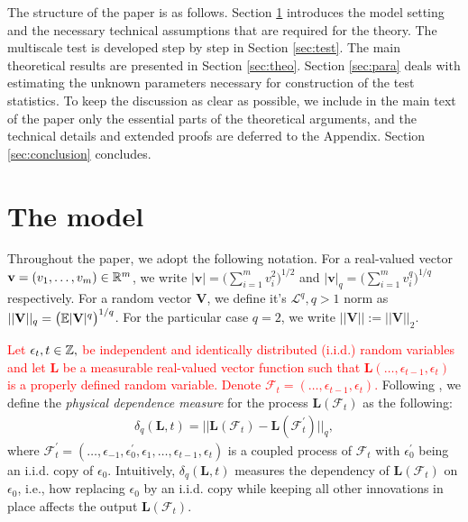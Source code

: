 \documentclass[a4paper,12pt]{article}
\begin{document}
The structure of the paper is as follows. Section \ref{sec:model} introduces the model setting and the necessary technical assumptions that are required for the theory. The multiscale test is developed step by step in Section \ref{sec:test}. The main theoretical results are presented in Section \ref{sec:theo}. Section \ref{sec:para} deals with estimating the unknown parameters necessary for construction of the test statistics. To keep the discussion as clear as possible, we include in the main text of the paper only the essential parts of the theoretical arguments, and the technical details and extended proofs are deferred to the Appendix. Section \ref{sec:conclusion} concludes.


\section{The model}\label{sec:model}

Throughout the paper, we adopt the following notation. For a real-valued vector \linebreak $\mathbf{v} = (v_1, \ldots, v_m)\in\mathbb{R}^m$, we write $|\mathbf{v}| = \big(\sum_{i=1}^m v_i^2\big)^{1/2}$ and $|\mathbf{v}|_q = \big(\sum_{i=1}^m v_i^q\big)^{1/q}$ respectively. For a random vector $\mathbf{V}$, we define it's $\mathcal{L}^q, q>1$ norm as $||\mathbf{V}||_q = \big(\mathbb{E} |\mathbf{V}|^q\big)^{1/q}$. For the particular case $q = 2$, we write $||\mathbf{V}|| := ||\mathbf{V}||_2$.

\textcolor{red}{Let $\epsilon_t, t \in \mathbb{Z},$ be independent and identically distributed (i.i.d.) random variables and let $\mathbf{L}$ be a measurable real-valued vector function such that $\mathbf{L}(\ldots, \epsilon_{t-1}, \epsilon_t)$ is a properly defined random variable. Denote $\mathcal{F}_t  = (\ldots, \epsilon_{t-1}, \epsilon_t)$.}  Following \cite{Wu2005}, we define the \textit{physical dependence measure} for the process $\mathbf{L}(\mathcal{F}_t)$ as the following:
\begin{align}\label{eq:physical_dep}
 \delta_q(\mathbf{L}, t) = || \mathbf{L}(\mathcal{F}_t) - \mathbf{L}(\mathcal{F}_t^\prime) ||_q,
\end{align}
where $\mathcal{F}_t^\prime  = (\ldots, \epsilon_{-1}, \epsilon^\prime_0, \epsilon_1, \ldots, \epsilon_{t-1}, \epsilon_t)$ is a coupled process of $\mathcal{F}_t$ with $\epsilon_0^\prime$ being an i.i.d. copy of $\epsilon_0$. Intuitively, $\delta_q(\mathbf{L}, t)$ measures the dependency of $\mathbf{L}(\mathcal{F}_t)$ on $\epsilon_0$, i.e., how replacing $\epsilon_0$ by an i.i.d. copy while keeping all other innovations in place affects the output $\mathbf{L}(\mathcal{F}_t)$.
\end{document}
